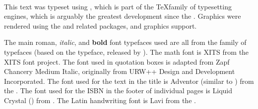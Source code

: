 \vfill\mbox{}
\newpage
\renewcommand{\headrulewidth}{1pt}
\thispagestyle{empty}%
\mbox{}\\\vfill
{}
{\sffamily
This text was typeset using \hi{\XeLaTeX},
which is part of the \TeX family of typesetting engines, 
which is arguably the greatest development since the .
Graphics were rendered using the  and related packages, and \hi{\LaTeX} graphics support.

The main {\rmfamily roman}, {\itshape italic}, and {\bfseries bold} font typefaces used 
are all from the  family of typefaces
(based on the  typeface, released by ).
The math font is {{\fntXits XITS}} from the {{\fntXits XITS font project}}.
The font used in quotation boxes is adapted from {\fntZapf Zapf Chancery Medium Italic},
originally from URW++ Design and Development Incorporated.
The font used for the text in the title is {\fntAdventor Adventor} (similar to ) from the .
The font used for the ISBN in the footer of individual pages is 
\mbox{\fntDigital\footnotesize Liquid} \mbox{\fntDigital\footnotesize Crystal} 
() from .
The Latin handwriting font is {\fntLavi Lavi} from the .

}
